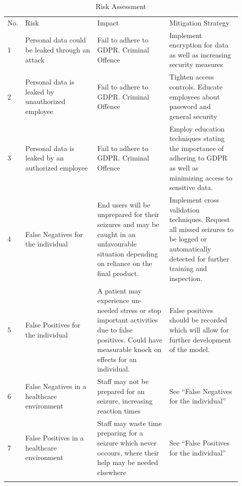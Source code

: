 \documentclass[12pt]{article}
\begin{document}
\begin{longtable}{p{0.03\linewidth}p{0.3\linewidth}p{0.3\linewidth}p{0.3\linewidth}}
No. & Risk                                              & Impact                                                      & Mitigation Strategy                                          \\
1 & Personal data could be leaked through an attack   & Fail to adhere to GDPR. Criminal Offence & Implement encryption for data as well as increasing security measures \\
2 & Personal data is leaked by unauthorized employee  & Fail to adhere to GDPR. Criminal Offence& Tighten access controls. Educate employees about password and general security\\
3 & Personal data is leaked by an authorized employee & Fail to adhere to GDPR. Criminal Offence& Employ education techniques stating the importance of adhering to GDPR as well as minimizing access to sensitive data.\\
4 & False Negatives for the individual& End users will be unprepared for their seizures and may be caught in an unfavourable situation depending on reliance on the final product.& Implement cross validation techniques. Request all missed seizures to be logged or automatically detected for further training and inspection. \\
5 & False Positives for the individual& A patient may experience un-needed stress or stop important activities due to false positives. Could have measurable knock on effects for an individual. & False positives should be recorded which will allow for further development of the model.\\
6 & False Negatives in a healthcare environment & Staff may not be prepared for an seizure, increasing reaction times & See ``False Negatives for the individual''\\
7 & False Positives in a healthcare environment & Staff may waste time preparing for a seizure which never occours, where their help may be needed elsewhere & See ``False Positives for the individual'' \\
\caption{Risk Assessment}
\label{tab:risk-assessment}
\end{longtable}
\end{document}
